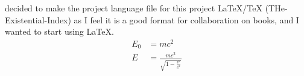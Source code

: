 \documentclass{article} %
\title{\ProjectLanguageFile} %
\begin{document}
  \maketitle
  \I decided to make the project language file for this project LaTeX/TeX (THe-Existential-Index) as I feel it is a good format for collaboration on books, and I wanted to start using LaTeX.
  \begin{align}
    E_0 &= mc^2 \\
    E &= \frac{mc^2}{\sqrt{1-\frac{v^2}{c^2}}}
  \end{align} 
\end{document}

